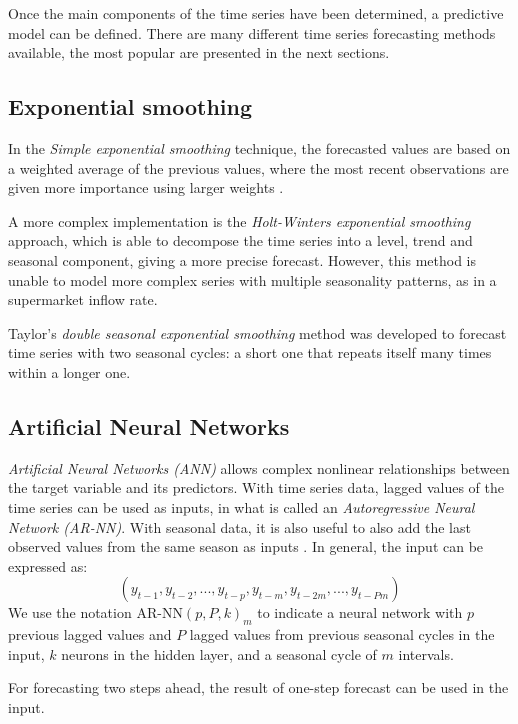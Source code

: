 Once the main components of the time series have been determined, a predictive model can be defined. There are many different time series forecasting methods available, the most popular are presented in the next sections.



\subsection{Exponential smoothing}
\label{subsec:exponential_smoothing}
In the \emph{Simple exponential smoothing} technique, the forecasted values are based on a weighted average of the previous values, where the most recent observations are given more importance using larger weights \cite{hyndman}.

A more complex implementation is the \emph{Holt-Winters exponential smoothing} approach, which is able to decompose the time series into a level, trend and seasonal component, giving a more precise forecast. However, this method is unable to model more complex series with multiple seasonality patterns, as in a supermarket inflow rate.

Taylor’s \emph{double seasonal exponential smoothing} method \cite{taylor} was developed to forecast time series with two seasonal cycles: a short one that repeats itself many times within a longer one.


\subsection{Artificial Neural Networks}
\label{subsec:artificial_neural_networks}
\emph{Artificial Neural Networks (ANN)} allows complex nonlinear relationships between the target variable and its predictors. With time series data, lagged values of the time series can be used as inputs, in what is called an \emph{Autoregressive Neural Network (AR-NN)}. With seasonal data, it is also useful to also add the last observed values from the same season as inputs \cite{hyndman}. In general, the input can be expressed as:
\[ (y_{t-1}, y_{t-2}, ..., y_{t-p}, y_{t-m}, y_{t-2m}, ..., y_{t-Pm}) \]
We use the notation \( \text{AR-NN}(p, P, k)_m \) to indicate a neural network with \( p \) previous lagged values and \( P \) lagged values from previous seasonal cycles in the input, \( k \) neurons in the hidden layer, and a seasonal cycle of \( m \) intervals.

For forecasting two steps ahead, the result of one-step forecast can be used in the input.


